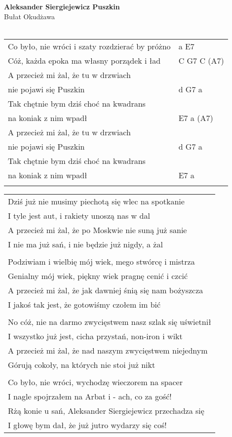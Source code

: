 \documentclass[a5paper]{article}
\begin{document}


\noindent
\fontsize{12pt}{15pt}\selectfont
\textbf{Aleksander Siergiejewicz Puszkin} \\
\fontsize{8pt}{10pt}\selectfont
Bułat Okudżawa \\ \\
\fontsize{10pt}{12pt}\selectfont
{}
\begin{tabular}{@{}p{8.5cm}p{3cm}@{}}
\noindent
Co było, nie wróci i szaty rozdzierać by próżno & a E7 \\
Cóż, każda epoka ma własny porządek i ład & C G7 C (A7) \\
A przecież mi żal, że tu w drzwiach \\
nie pojawi się Puszkin & d G7 a \\
Tak chętnie bym dziś choć na kwadrans \\
na koniak z nim wpadł & E7 a (A7) \\
A przecież mi żal, że tu w drzwiach \\
nie pojawi się Puszkin & d G7 a \\
Tak chętnie bym dziś choć na kwadrans \\
na koniak z nim wpadł & E7 a \\ \\
\end{tabular}

\noindent
{}
\begin{tabular}{@{}p{10cm}@{}}
\noindent
Dziś już nie musimy piechotą się wlec na spotkanie\\
I tyle jest aut, i rakiety unoszą nas w dal\\
A przecież mi żal, że po Moskwie nie suną już sanie\\
I nie ma już sań, i nie będzie już nigdy, a żal\\ \\

Podziwiam i wielbię mój wiek, mego stwórcę i mistrza\\
Genialny mój wiek, piękny wiek pragnę cenić i czcić\\
A przecież mi żal, że jak dawniej śnią się nam bożyszcza\\
I jakoś tak jest, że gotowiśmy czołem im bić\\ \\

No cóż, nie na darmo zwycięstwem nasz szlak się uświetnił\\
I wszystko już jest, cicha przystań, non-iron i wikt\\
A przecież mi żal, że nad naszym zwycięstwem niejednym\\
Górują cokoły, na których nie stoi już nikt\\ \\

Co było, nie wróci, wychodzę wieczorem na spacer\\
I nagle spojrzałem na Arbat i - ach, co za gość!\\
Rżą konie u sań, Aleksander Siergiejewicz przechadza się\\
I głowę bym dał, że już jutro wydarzy się coś!
\end{tabular}
\end{document}

